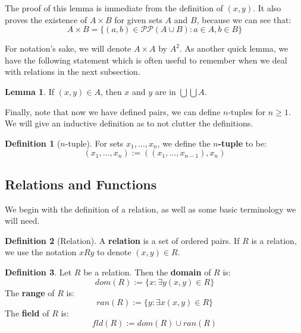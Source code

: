 \documentclass[11pt, oneside]{article}   	%
\theoremstyle{definition}
\newtheorem{definition}{Definition}[section]
\newtheorem{lemma}[theorem]{Lemma}
\begin{document}
The proof of this lemma is immediate from the definition of $(x, y)$. It also proves the existence of $A\times B$ for given sets 
$A$ and $B$, because we can see that:
$$
	A\times B = \{(a, b)\in \mathcal P\mathcal P (A\cup B) : a\in A, b\in B\}
$$

For notation's sake, we will denote $A\times A$ by $A^2$. As another quick lemma, we have the following statement which is 
often useful to remember when we deal with relations in the next subsection.

\begin{lemma}
	If $(x, y)\in A$, then $x$ and $y$ are in $\bigcup\bigcup A$. ~
	\label{lemma:3d}
\end{lemma}

Finally, note that now we have defined pairs, we can define $n$-tuples for $n \geq 1$. We will give an inductive definition as to 
not clutter the definitions.

\begin{definition}[$n$-tuple]
	For sets $x_1, ..., x_n$, we define the \textbf{$n$-tuple} to be:
	\begin{equation}
		(x_1, ..., x_n) := ((x_1, ..., x_{n - 1}), x_n)
	\end{equation}
\end{definition}

\subsection{Relations and Functions}

We begin with the definition of a relation, as well as some basic terminology we will need.

\begin{definition}[Relation]
	A \textbf{relation} is a set of ordered pairs. If $R$ is a relation, we use the notation $xRy$ to denote $(x, y)\in R$. 
\end{definition}

\begin{definition}
	Let $R$ be a relation. Then the \textbf{domain} of $R$ is:
	\begin{equation}
		dom(R) := \{x : \exists y (x, y)\in R\}
	\end{equation}
	The \textbf{range} of $R$ is:
	\begin{equation}
		ran(R) := \{y : \exists x (x, y)\in R\}
	\end{equation}
	The \textbf{field} of $R$ is:
	\begin{equation}
		fld(R) := dom(R)\cup ran(R)
	\end{equation}
\end{definition}
\end{document}
